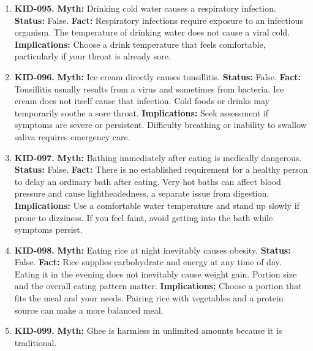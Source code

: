 \documentclass[11pt,oneside]{book}
\begin{document}
\begin{enumerate}[leftmargin=0pt,labelwidth=0pt,labelsep=0pt,itemindent=0pt]
\item[] \textbf{KID-095.} \textbf{Myth:} Drinking cold water causes a respiratory infection.\newline
\textbf{Status:} False.\newline
\textbf{Fact:} Respiratory infections require exposure to an infectious organism. The temperature of drinking water does not cause a viral cold. \cite{ref4}\newline
\textbf{Implications:} Choose a drink temperature that feels comfortable, particularly if your throat is already sore.
\item[] \textbf{KID-096.} \textbf{Myth:} Ice cream directly causes tonsillitis.\newline
\textbf{Status:} False.\newline
\textbf{Fact:} Tonsillitis usually results from a virus and sometimes from bacteria. Ice cream does not itself cause that infection. Cold foods or drinks may temporarily soothe a sore throat. \cite{ref373}\newline
\textbf{Implications:} Seek assessment if symptoms are severe or persistent. Difficulty breathing or inability to swallow saliva requires emergency care.
\item[] \textbf{KID-097.} \textbf{Myth:} Bathing immediately after eating is medically dangerous.\newline
\textbf{Status:} False.\newline
\textbf{Fact:} There is no established requirement for a healthy person to delay an ordinary bath after eating. Very hot baths can affect blood pressure and cause lightheadedness, a separate issue from digestion. \cite{ref374}\newline
\textbf{Implications:} Use a comfortable water temperature and stand up slowly if prone to dizziness. If you feel faint, avoid getting into the bath while symptoms persist.
\item[] \textbf{KID-098.} \textbf{Myth:} Eating rice at night inevitably causes obesity.\newline
\textbf{Status:} False.\newline
\textbf{Fact:} Rice supplies carbohydrate and energy at any time of day. Eating it in the evening does not inevitably cause weight gain. Portion size and the overall eating pattern matter. \cite{ref191}\newline
\textbf{Implications:} Choose a portion that fits the meal and your needs. Pairing rice with vegetables and a protein source can make a more balanced meal.
\item[] \textbf{KID-099.} \textbf{Myth:} Ghee is harmless in unlimited amounts because it is traditional.\newline

\end{enumerate}
\end{document}
